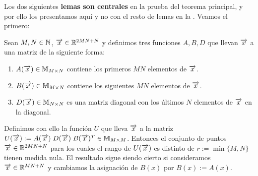 Los dos siguientes \textbf{lemas son centrales} en la prueba del teorema principal, y por ello los presentamos aquí y no con el resto de lemas en la  . Veamos el primero:

\begin{lema} \label{lema:primer_lema}

    Sean $M, N \in \mathbb{N}$, $\overrightarrow{x} \in \mathbb{R}^{2MN + N}$ y definimos tres funciones $A, B, D$ que llevan $\overrightarrow{x}$ a una matriz de la siguiente forma:

    \begin{enumerate}
        \item $A(\overrightarrow{x}) \in \mathbb{M}_{M \times N}$ contiene los primeros $MN$ elementos de $\overrightarrow{x}$.
        \item $B(\overrightarrow{x}) \in \mathbb{M}_{M \times N}$ contiene los siguientes $MN$ elementos de $\overrightarrow{x}$.
        \item $D(\overrightarrow{x}) \in \mathbb{M}_{N \times N}$ es una matriz diagonal con los últimos $N$ elementos de $\overrightarrow{x}$ en la diagonal.
    \end{enumerate}

    Definimos con ello la función $U$ que lleva $\overrightarrow{x}$ a la matriz $U(\overrightarrow{x}) := A(\overrightarrow{x}) \; D(\overrightarrow{x}) \; B(\overrightarrow{x})^T \in \mathbb{M}_{M \times M}$. Entonces el conjunto de puntos $\overrightarrow{x} \in \mathbb{R}^{2MN + N}$ para los cuales el rango de $U(\overrightarrow{x})$ es distinto de $r := \min \{M, N\}$ tienen medida nula. El resultado sigue siendo cierto si consideramos $\overrightarrow{x} \in \mathbb{R}^{MN+N}$ y cambiamos la asignación de $B(x)$ por $B(x) := A(x)$.
\end{lema}

